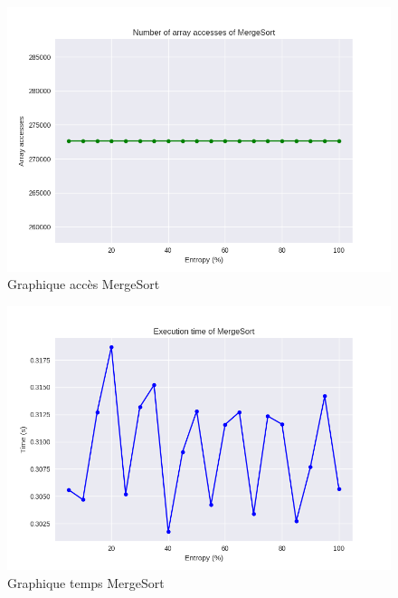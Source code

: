 \documentclass[10pt,a4paper]{article}
\begin{document}
            \begin{figure}
                \centering
                \includegraphics[width=1\textwidth]{graphique/MergeSort/GraphAccessesMergeSort.png}
                \caption{Graphique accès MergeSort}
                \label{fig:mesh1}
            \end{figure}
            \begin{figure}
                \centering
                \includegraphics[width=1\textwidth]{graphique/MergeSort/GraphTimeMergeSort.png}
                \caption{Graphique temps MergeSort}
                \label{fig:mesh1}
            \end{figure}
\end{document}
